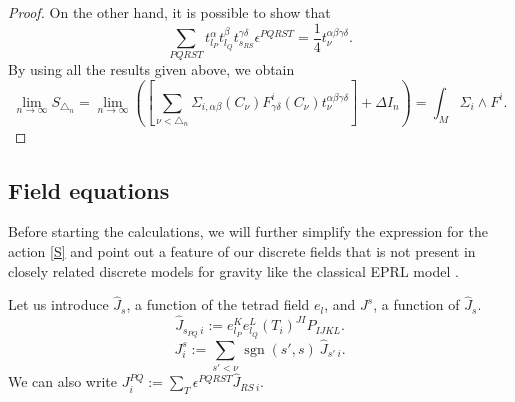 \documentclass{article}
\DeclareMathOperator{\sgn}{sgn}
\begin{document}
\begin{proof}
	On the other hand, it is possible to show that
	\begin{equation}\label{ident}
		\sum_{PQRST}t_{l_P}^{\alpha}t_{l_Q}^{\beta}t_{s_{RS}}^{\gamma\delta}\epsilon^{PQRST}=\dfrac{1}{4}t_{\nu}^{\alpha\beta\gamma\delta}.
	\end{equation}	
	By using all the results given above, we obtain 
	\begin{equation}\label{result}
		\lim_{n\rightarrow\infty}S_{\triangle_n}=\lim_{n\rightarrow\infty}\left(\left[\sum_{\nu<\triangle_n}\Sigma_{i,\alpha\beta}(C_{\nu})F_{\gamma\delta}^{i}(C_{\nu})t_{\nu}^{\alpha\beta\gamma\delta}\right]+\Delta I_{n}\right)=\int_{M}\Sigma_{i}\wedge F^{i}.
	\end{equation}	
	
\end{proof}		 	 



\subsection{Field equations}
\label{field}

Before starting the calculations, we will further simplify the expression for the action \eqref{S} and point out a feature of our discrete fields that is not present in closely related discrete models for gravity like the classical EPRL model \cite{EPRL}. 

Let us introduce $\hat{J}_s$, a function of the tetrad field $e_{l}$, and $J^{s}$, a function of $\hat{J}_s$. 
\begin{equation}\label{jtilde}
	\hat{J}_{s_{PQ}~i}:= e_{l_P}^{K}e_{l_Q}^{L}\left(T_{i}\right)^{JI}P_{IJKL}.
\end{equation} 
%
\begin{equation}\label{Bf}
	J^s_{i}:= \sum_{s' <\nu} \sgn(s', s) \ \hat{J}_{s'~i} .
\end{equation} 
We can also write $J^{PQ}_{i} := \sum_T \epsilon^{PQRST} \hat{J}_{{RS}~i}$. 
\end{document}
